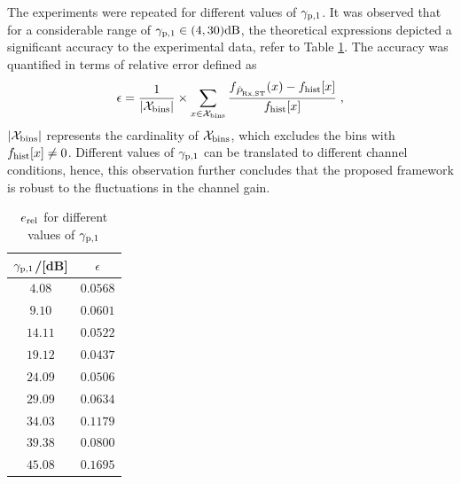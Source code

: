 The experiments were repeated for different values of ${\gamma}_{\text{p,1}}$. It was observed that for a considerable range of ${\gamma}_{\text{p,1}} \in (4,30)\SI{}{dB}$, the theoretical expressions depicted a significant accuracy to the experimental data, refer to Table \ref{nichtzentral}. The accuracy was quantified in terms of relative error defined as
\begin{equation}
\label{fr}
\epsilon = \frac{1}{|\mathcal X_{\text{bins}}|} \times \sum_{x \in \mathcal X_{\text{bins}}} \frac{f_{\hat{P}_{\text{Rx,ST}}}(x) - f_{\text{hist}}[x]}{f_{\text{hist}}[x]} \;  , 
\end{equation}
$|\mathcal X_{\text{bins}}|$ represents the cardinality of $\mathcal X_{\text{bins}}$, which excludes the bins with $f_{\text{hist}}[x] \neq 0$. Different values of ${\gamma}_{\text{p,1}}$ can be translated to different channel conditions, hence, this observation further concludes that the proposed framework is robust to the fluctuations in the channel gain. 


\begin{table}
        \renewcommand{\arraystretch}{1.4}
	\centering
	\caption{$e_{\text{rel}}$ for different values of ${\gamma}_{\text{p,1}}$}
	\label{nichtzentral}
	\begin{tabular}{c||c} 
		\bfseries ${\gamma}_{\text{p,1}}$/[dB] &  \bfseries $\epsilon$ \\ \hline \hline
		$4.08$ &  $0.0568$ \\
		$9.10$ &  $0.0601$ \\
		$14.11$ & $0.0522$ \\
		$19.12$ & $0.0437$ \\
		$24.09$ & $0.0506$ \\
		$29.09$ & $0.0634$ \\
		$34.03$ & $0.1179$ \\
		$39.38$ & $0.0800$ \\
		$45.08$ & $0.1695$ \\ \hline
	\end{tabular}
\end{table}


